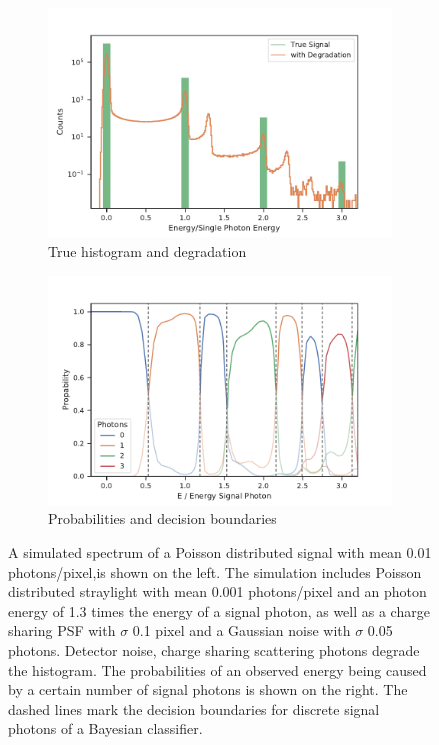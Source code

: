 \begin{figure}
	\centering
	\begin{subfigure}[b]{0.49\textwidth}
		\includegraphics[width=\linewidth]{images/sharing.pdf}
		\caption{True histogram and degradation}
		\label{fig:degrad}
	\end{subfigure}
	\begin{subfigure}[b]{0.49\textwidth}
		\includegraphics[width=\linewidth]{images/probs.pdf}
		\caption{Probabilities and decision boundaries}
		\label{fig:probs}
	\end{subfigure}
	
	\caption[Histogram, probabilities and decision boundaries for the photon number under the influence of charge sharing and noise]{A simulated spectrum of a Poisson distributed signal with mean 0.01 photons/pixel,is shown on the left.  The simulation includes Poisson distributed straylight with mean 0.001 photons/pixel and an photon energy of 1.3 times the energy of a signal photon, as well as a charge sharing PSF with $\sigma$ 0.1 pixel and a Gaussian noise with $\sigma$ 0.05 photons. Detector noise, charge sharing scattering photons degrade the histogram. The probabilities of an observed energy being caused by a certain number of signal photons is shown on the right. The dashed lines mark the decision boundaries for discrete signal photons of a Bayesian classifier.} 
\end{figure}


